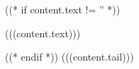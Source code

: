 ((* if content.text != '' *))
\begin{example}{}
(((content.text)))
\end{example}
((* endif *))
(((content.tail)))
